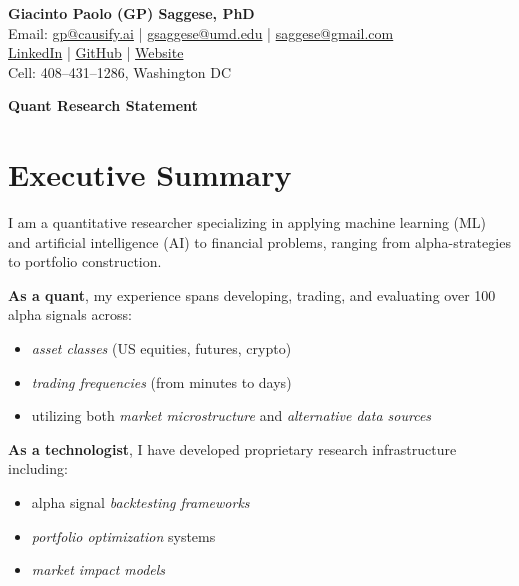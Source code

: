 \documentclass[11pt, letterpaper]{article}
\begin{document}
  \begin{center}
    {\LARGE \textbf{Giacinto Paolo (GP) Saggese, PhD}} \\[6pt]

    {\large Email: \href{mailto:gp@causify.ai}{gp@causify.ai} \;|\; \href{mailto:gsaggese@umd.edu}{gsaggese@umd.edu} \;|\; \href{mailto:saggese@gmail.com}{saggese@gmail.com} }\\[6pt]

    {\large \href{https://www.linkedin.com/in/gpsaggese/}{LinkedIn} \;|\; \href{https://github.com/gpsaggese}{GitHub} \;|\; \href{https://gpsaggese.github.io/}{Website} }\\[6pt]

    {\large Cell: 408--431--1286, Washington DC }
  \end{center}

  \vspace{12pt}

  \begin{center}
    {\LARGE \textbf{Quant Research Statement}}
  \end{center}

  \vspace{12pt}

  \tableofcontents
  \newpage

  \section{Executive Summary}
  \label{executive-summary}

  I am a quantitative researcher specializing in applying machine learning (ML)
  and artificial intelligence (AI) to financial problems, ranging from
  alpha-strategies to portfolio construction.

  \textbf{As a quant}, my experience spans developing, trading, and evaluating
  over 100 alpha signals across:
  \begin{itemize}
    \item \textit{asset classes} (US equities, futures, crypto)
    \item \textit{trading frequencies} (from minutes to days)
    \item utilizing both \textit{market microstructure} and \textit{alternative
      data sources}
  \end{itemize}

  \textbf{As a technologist}, I have developed proprietary research
  infrastructure including:
  \begin{itemize}
    \item alpha signal \textit{backtesting frameworks}
    \item \textit{portfolio optimization} systems
    \item \textit{market impact models}
  \end{itemize}
\end{document}
